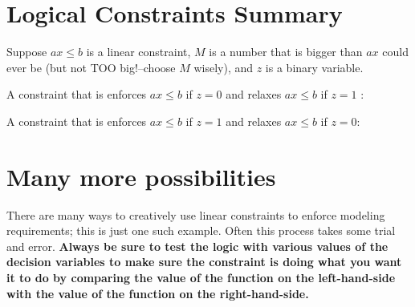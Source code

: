 \documentclass[11pt]{article}
\theoremstyle{definition}
\newcommand{\answerbox}[3]{%
  \fbox{%
    \begin{minipage}[#1]{#2}
      \hfill\vspace{#3}
    \end{minipage}
  }
}
\begin{document}
\section{Logical Constraints Summary}

\begin{tcolorbox}
Suppose $ax \leq b$ is a linear constraint, $M$ is a number that is bigger than $ax$ could ever be (but not TOO big!--choose $M$ wisely), and $z$ is a binary variable.  
\bigskip

A constraint that is enforces $ax \leq b$ if $z = 0$ and relaxes $ax \leq b$ if $z=1$ :

\begin{center}
\answerbox{c}{4in}{0.3in}
\end{center}

\bigskip
A constraint that is enforces $ax \leq b$ if $z = 1$ and relaxes $ax \leq b$ if $z=0$:

\begin{center}
\answerbox{c}{4in}{0.3in}
\end{center}

\bigskip
\end{tcolorbox}

\section{Many more possibilities}

There are many ways to creatively use linear constraints to enforce modeling requirements; this is just one such example.  Often this process takes some trial and error.  \textbf{Always be sure to test the logic with various values of the decision variables to make sure the constraint is doing what you want it to do by comparing the value of the function on the left-hand-side with the value of the function on the right-hand-side.}
\end{document}
